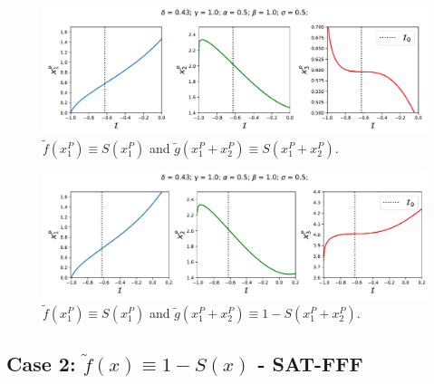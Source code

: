 \begin{figure}[H]
    \centering
    \includegraphics[scale=0.5]{figs/numerics/unsatfff_twoinput_1.pdf}
    \caption{$\tilde{f}(x_1^P) \equiv S(x_1^P)$ and $\tilde{g}(x_1^P + x_2^P) \equiv S(x_1^P + x_2^P)$.}
    \label{fig:unsat_ex1}
\end{figure}

\begin{figure}[H]
    \centering
    \includegraphics[scale=0.5]{figs/numerics/unsatfff_twoinput_2.pdf}
    \caption{$\tilde{f}(x_1^P) \equiv S(x_1^P)$ and $\tilde{g}(x_1^P + x_2^P) \equiv 1 - S(x_1^P + x_2^P)$.}
    \label{fig:unsat_ex1-1}
\end{figure}

\subsection{Case 2: $\tilde{f}(x) \equiv 1 - S(x)$ - SAT-FFF}

